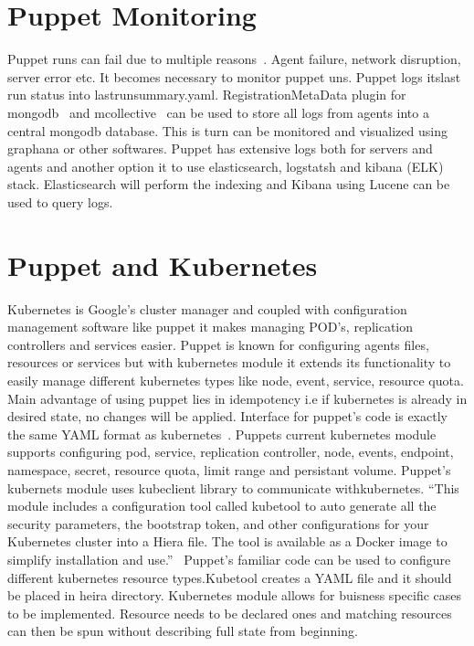 \section{Puppet Monitoring}
Puppet runs can fail due to multiple reasons~\cite{hid-sp18-413-puppet-monitoring}. Agent failure, network
disruption, server error etc. It becomes necessary to monitor puppet
uns. Puppet logs itslast run status into
lastrunsummary.yaml. RegistrationMetaData plugin for mongodb~\cite{hid-sp18-413-puppet-mongodb} and
mcollective~\cite{hid-sp18-413-puppet-mcollective} can be used to store all logs from
agents into a central mongodb database. This is turn can be monitored
and visualized using graphana or other softwares. Puppet has extensive
logs both for servers and agents and another option it to use
elasticsearch, logstatsh and kibana (ELK) stack. Elasticsearch will
perform the indexing and Kibana using Lucene can be used to query logs.

\section{Puppet and Kubernetes}

Kubernetes is Google's cluster manager and coupled with configuration
management software like puppet it makes managing POD's, replication
controllers and services easier. Puppet is known for configuring
agents files, resources or services but with kubernetes module it
extends its functionality to easily manage different kubernetes types
like node, event, service, resource quota. Main advantage of using
puppet lies in idempotency i.e if kubernetes is already in desired
state, no changes will be applied. Interface for puppet's code is
exactly the same YAML format as
kubernetes~\cite{hid-sp18-413-puppet-kubernetes}. Puppets current
kubernetes module supports configuring pod, service, replication
controller, node, events, endpoint, namespace, secret, resource quota,
limit range and persistant volume.  Puppet's kubernets module uses
kubeclient library to communicate withkubernetes. ``This module
includes a configuration tool called kubetool to auto generate all the
security parameters, the bootstrap token, and other configurations for
your Kubernetes cluster into a Hiera file. The tool is available as a
Docker image to simplify installation and
use.''~\cite{hid-sp18-413-puppet-kubeclient} Puppet's familiar code
can be used to configure different kubernetes resource types.Kubetool
creates a YAML file and it should be placed in heira
directory. Kubernetes module allows for buisness specific cases to be
implemented. Resource needs to be declared ones and matching resources
can then be spun without describing full state from beginning.

